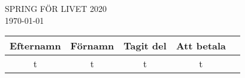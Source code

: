 \documentclass{article}
\begin{document}
\begin{center}
    \Huge\textsc{SPRING FÖR LIVET 2020} \normalsize \\
    \vspace{5ex}
    \Huge\today \normalsize \\
    \vspace{6ex}
        
        \Huge
        \begin{tabular}{|c|c|c|c|c|}
            \hline 
            \textbf{Efternamn} & \textbf{Förnamn} & \textbf{Tagit del} & \textbf{Att betala} \\
            \hline 
            \hline
		t & t & t & t \\
            \hline
        \end{tabular}
    \end{center}
\end{document}
